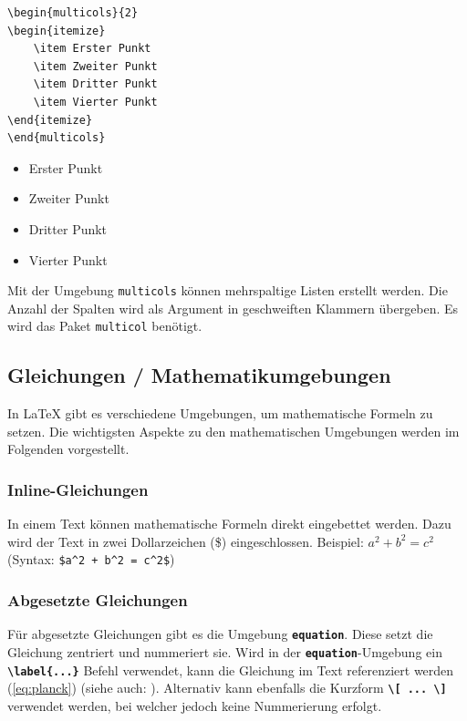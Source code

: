 \begin{minipage}{0.50\textwidth}
    \begin{lstlisting}[language={[LaTeX]TeX}]
\begin{multicols}{2}
\begin{itemize}
    \item Erster Punkt
    \item Zweiter Punkt
    \item Dritter Punkt
    \item Vierter Punkt
\end{itemize}
\end{multicols}
\end{lstlisting}
\end{minipage}
\hfill
\begin{minipage}{0.48\textwidth}
    \begin{multicols}{2}
        \begin{itemize}
            \item Erster Punkt
            \item Zweiter Punkt
            \item Dritter Punkt
            \item Vierter Punkt
        \end{itemize}
    \end{multicols}
\end{minipage}

Mit der Umgebung \texttt{multicols} können mehrspaltige Listen erstellt werden. Die Anzahl der Spalten wird als Argument in geschweiften Klammern übergeben. Es wird das Paket \texttt{multicol} benötigt.

\subsection{Gleichungen / Mathematikumgebungen}
In \LaTeX{} gibt es verschiedene Umgebungen, um mathematische Formeln zu setzen. Die wichtigsten Aspekte zu den mathematischen Umgebungen werden im Folgenden vorgestellt.

\subsubsection{Inline-Gleichungen}
In einem Text können mathematische Formeln direkt eingebettet werden. Dazu wird der Text in zwei Dollarzeichen (\$) eingeschlossen.
Beispiel: $a^2 + b^2 = c^2$ (Syntax: \texttt{\$a\^{}2 + b\^{}2 = c\^{}2\$})

\subsubsection{Abgesetzte Gleichungen}
Für abgesetzte Gleichungen gibt es die Umgebung \textbf{\texttt{equation}}. Diese setzt die Gleichung zentriert und nummeriert sie.
Wird in der \textbf{\texttt{equation}}-Umgebung ein \textbf{\texttt{\textbackslash label\{...\}}} Befehl verwendet, kann die Gleichung im Text referenziert werden (\autoref{eq:planck}) (siehe auch: ).
Alternativ kann ebenfalls die Kurzform \textbf{\texttt{\textbackslash [ ... \textbackslash ]}} verwendet werden, bei welcher jedoch keine Nummerierung erfolgt.

